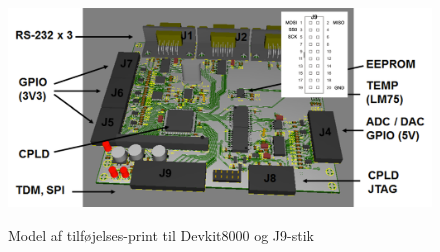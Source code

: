 \begin{figure}[H]
\centering
{\includegraphics[width=\textwidth]{filer/design/Billeder/devkit_j9}}
\caption{Model af tilføjelses-print til Devkit8000 og J9-stik }
\label{lab:devkit_j9}
\end{figure}